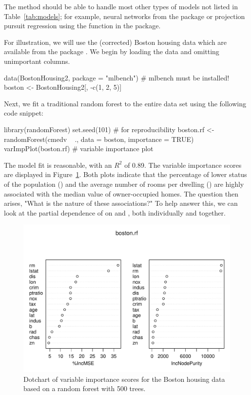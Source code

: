 The  method should be able to handle most other types of models not listed in Table~\ref{tab:models}; for example, neural networks from the  package \citep{venables-modern-2002} or projection pursuit regression \citep{friedman-ppr-1981} using the  function in the  package.

For illustration, we will use the (corrected) Boston housing data which are available from the  package \citep{mlbench-pkg}. We begin by loading the data and omitting unimportant columns.
\begin{example}
data(BostonHousing2, package = "mlbench")  # mlbench must be installed!
boston <- BostonHousing2[, -c(1, 2, 5)]
\end{example}
Next, we fit a traditional random forest to the entire data set using the following code snippet: 
\begin{example}
library(randomForest)
set.seed(101)  # for reproducibility
boston.rf <- randomForest(cmedv ~ ., data = boston, importance = TRUE)
varImpPlot(boston.rf)  # variable importance plot
\end{example}
The model fit is reasonable, with an  $R^2$ of 0.89. The variable importance scores are displayed in Figure~\ref{fig:plotmo_vs_partial}. Both plots indicate that the percentage of lower status of the population () and the average number of rooms per dwelling () are highly associated with the median value of owner-occupied homes. The question then arises, "What is the nature of these associations?" To help answer this, we can look at the partial dependence of  on  and , both individually and together. 

\begin{figure}[htbp]
  \centering
  \includegraphics[width=1.0\linewidth]{boston_rf_vimp}
  \caption{Dotchart of variable importance scores for the Boston housing data based on a random forest with 500 trees.}
  \label{fig:plotmo_vs_partial}
\end{figure}


